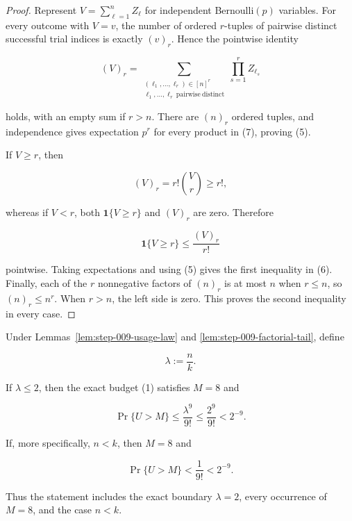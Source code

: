 \begin{proof}
Represent \(V=\sum_{\ell=1}^n Z_\ell\) for independent
Bernoulli\((p)\) variables. For every outcome with \(V=v\), the number of
ordered \(r\)-tuples of pairwise distinct successful trial indices is
exactly \((v)_r\). Hence the pointwise identity

\[
(V)_r
=\sum_{\substack{(\ell_1,\ldots,\ell_r)\in[n]^r\\
                    \ell_1,\ldots,\ell_r\ \mathrm{pairwise\ distinct}}}
  \prod_{s=1}^r Z_{\ell_s}
\tag{7}
\]

holds, with an empty sum if \(r>n\). There are \((n)_r\) ordered tuples,
and independence gives expectation \(p^r\) for every product in (7),
proving (5).

If \(V\ge r\), then

\[
(V)_r=r!\binom Vr\ge r!,
\]

whereas if \(V<r\), both \(\mathbf1\{V\ge r\}\) and \((V)_r\) are zero.
Therefore

\[
\mathbf1\{V\ge r\}\le\frac{(V)_r}{r!}
\]

pointwise. Taking expectations and using (5) gives the first inequality in
(6). Finally, each of the \(r\) nonnegative factors of \((n)_r\) is at
most \(n\) when \(r\le n\), so \((n)_r\le n^r\). When \(r>n\), the
left side is zero. This proves the second inequality in every case.
\end{proof}

\begin{lemma}\label{lem:step-009-small-mean}
Under Lemmas~\ref{lem:step-009-usage-law} and
\ref{lem:step-009-factorial-tail}, define

\[
\lambda:=\frac nk.
\tag{8}
\]

If \(\lambda\le2\), then the exact budget (1) satisfies \(M=8\) and

\[
\Pr\{U>M\}
\le\frac{\lambda^9}{9!}
\le\frac{2^9}{9!}
<2^{-9}.
\tag{9}
\]

If, more specifically, \(n<k\), then \(M=8\) and

\[
\Pr\{U>M\}<\frac1{9!}<2^{-9}.
\tag{10}
\]

Thus the statement includes the exact boundary \(\lambda=2\), every
occurrence of \(M=8\), and the case \(n<k\).
\end{lemma}

